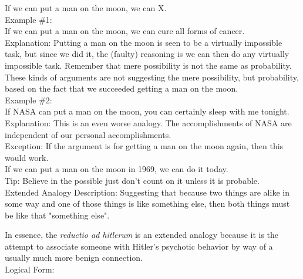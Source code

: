 \documentclass[a4paper,12pt,single,pdftex]{scrbook}
\begin{document}
    
      If we can put a man on the moon, we can X.
    \\

    
      Example \#1:
    \\

    
      If we can put a man on the moon, we can cure all forms of cancer.
    \\

    
      Explanation: Putting a man on the moon is seen to be a virtually impossible task, but since we did it, the (faulty) reasoning is we can then do any virtually impossible task.  Remember that mere possibility is not the same as probability.  These kinds of arguments are not suggesting the mere possibility, but probability, based on the fact that we succeeded getting a man on the moon.
    \\

    
      Example \#2:
    \\

    
      If NASA can put a man on the moon, you can certainly sleep with me tonight.
    \\

    
      Explanation: This is an even worse analogy. The accomplishments of NASA are independent of our personal accomplishments.
    \\

    
      Exception: If the argument is for getting a man on the moon again, then this would work.
    \\

    
      If we can put a man on the moon in 1969, we can do it today.
    \\

    
      Tip: Believe in the possible just don’t count on it unless it is probable.
    \\

  

Extended Analogy
    Description: Suggesting that because two things are alike in some way and one of those things is like something else, then both things must be like that "something else".

    
      In essence, the {\it reductio ad hitlerum} is an extended analogy because it is the attempt to associate someone with Hitler’s psychotic behavior by way of a usually much more benign connection.
    \\

    
      Logical Form:
    \\
\end{document}
